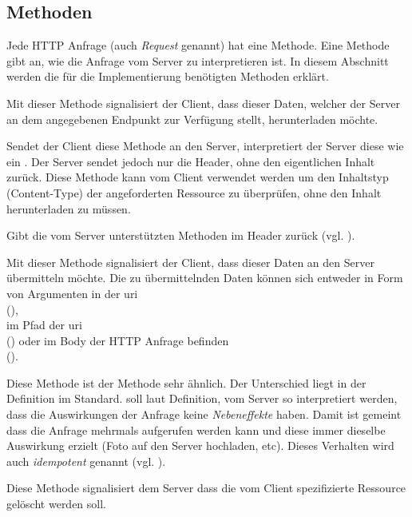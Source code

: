 \subsection{Methoden}
Jede HTTP Anfrage (auch \textit{Request} genannt) hat eine Methode. Eine Methode gibt an, wie die Anfrage vom Server zu interpretieren ist. In diesem Abschnitt werden die für die Implementierung benötigten Methoden erklärt.
\begin{description}\setlength\itemsep{1.5em}
\item[\mono{GET}] Mit dieser Methode signalisiert der Client, dass dieser Daten, welcher der Server an dem angegebenen Endpunkt zur Verfügung stellt, herunterladen möchte. 
\item[\mono{HEAD}] Sendet der Client diese Methode an den Server, interpretiert der Server diese wie ein . Der Server sendet jedoch nur die Header, ohne den eigentlichen Inhalt zurück. Diese Methode kann vom Client verwendet werden um den Inhaltstyp (Content-Type) der angeforderten Ressource zu überprüfen, ohne den Inhalt herunterladen zu müssen.
\item[\mono{OPTIONS}] Gibt die vom Server unterstützten Methoden im  Header zurück (vgl. \cite{sec:theory:http:method:options}).
\item[\mono{POST}] Mit dieser Methode signalisiert der Client, dass dieser Daten an den Server übermitteln möchte. Die zu übermittelnden Daten können sich entweder in Form von Argumenten in der \acrshort{uri}\\ (),\\ im Pfad der \acrshort{uri}\\ () oder im Body der HTTP Anfrage befinden\\().    
\item[\mono{PUT}] Diese Methode ist der  Methode sehr ähnlich. Der Unterschied liegt in der Definition im Standard.  soll laut Definition, vom Server so interpretiert werden, dass die Auswirkungen der Anfrage keine \textit{Nebeneffekte} haben. Damit ist gemeint dass die Anfrage mehrmals aufgerufen werden kann und diese immer dieselbe Auswirkung erzielt (Foto auf den Server hochladen, etc). Dieses Verhalten wird auch \textit{idempotent} genannt (vgl. \cite{sec:theory:http:method:put}).
\item[\mono{DELETE}] Diese Methode signalisiert dem Server dass die vom Client spezifizierte Ressource gelöscht werden soll.
\end{description}

